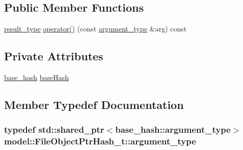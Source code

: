 \subsection*{Public Member Functions}
\begin{DoxyCompactItemize}
\item 
\hyperlink{structmodel_1_1_file_object_ptr_hash__t_a0d65fe59f4bccb6cdad8c6fffd050de0}{result\+\_\+type} \hyperlink{structmodel_1_1_file_object_ptr_hash__t_ae4cc4dbf4b4bb216b6eb5ea1a4dabd26}{operator()} (const \hyperlink{structmodel_1_1_file_object_ptr_hash__t_a591a96099c41cff7cd27032ba7406744}{argument\+\_\+type} \&arg) const 
\end{DoxyCompactItemize}
\subsection*{Private Attributes}
\begin{DoxyCompactItemize}
\item 
\hyperlink{structmodel_1_1_file_object_ptr_hash__t_abb641cce434aefcf7af938e24f711e0c}{base\+\_\+hash} \hyperlink{structmodel_1_1_file_object_ptr_hash__t_aaceace29dd9e96372549c841c3452253}{base\+Hash}
\end{DoxyCompactItemize}


\subsection{Member Typedef Documentation}
\subsubsection[{\texorpdfstring{argument\+\_\+type}{argument_type}}]{\setlength{\rightskip}{0pt plus 5cm}typedef std\+::shared\+\_\+ptr$<${\bf base\+\_\+hash\+::argument\+\_\+type}$>$ {\bf model\+::\+File\+Object\+Ptr\+Hash\+\_\+t\+::argument\+\_\+type}}\hypertarget{structmodel_1_1_file_object_ptr_hash__t_a591a96099c41cff7cd27032ba7406744}{}\label{structmodel_1_1_file_object_ptr_hash__t_a591a96099c41cff7cd27032ba7406744}
